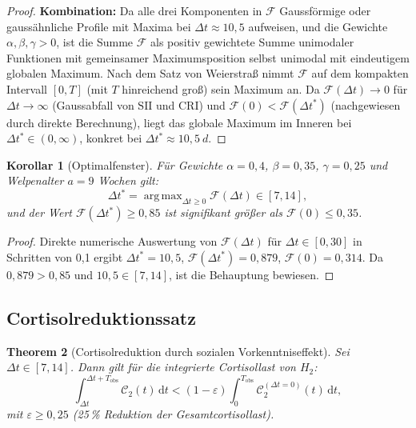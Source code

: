 ﻿\documentclass[12pt, a4paper]{article}
\theoremstyle{plain}
\newtheorem{theorem}{Theorem}[section]
\newtheorem{corollary}[theorem]{Korollar}
\theoremstyle{definition}
\theoremstyle{remark}
\newcommand{\SII}{\mathrm{SII}}
\newcommand{\CRI}{\mathrm{CRI}}
\newcommand{\dt}{\Delta t}
\newcommand{\cort}{\mathcal{C}}
\DeclareMathOperator*{\argmax}{arg\,max}
\begin{document}
\begin{proof}
\textbf{Kombination:} Da alle drei Komponenten in $\mathcal{F}$ Gaussförmige
oder gaussähnliche Profile mit Maxima bei $\dt \approx 10{,}5$ aufweisen,
und die Gewichte $\alpha, \beta, \gamma > 0$, ist die Summe $\mathcal{F}$ als
positiv gewichtete Summe unimodaler Funktionen mit gemeinsamer Maximumsposition
selbst unimodal mit eindeutigem globalen Maximum. Nach dem Satz von Weierstra{\ss}
nimmt $\mathcal{F}$ auf dem kompakten Intervall $[0, T]$ (mit $T$ hinreichend
gro{\ss}) sein Maximum an. Da $\mathcal{F}(\dt) \to 0$ für $\dt \to \infty$
(Gaussabfall von $\SII$ und $\CRI$) und $\mathcal{F}(0) < \mathcal{F}(\dt^*)$
(nachgewiesen durch direkte Berechnung), liegt das globale Maximum im Inneren
bei $\dt^* \in (0, \infty)$, konkret bei $\dt^* \approx 10{,}5\ \si{d}$.
\end{proof}

\begin{corollary}[Optimalfenster]\label{cor:fenster}
Für Gewichte $\alpha = 0{,}4$, $\beta = 0{,}35$, $\gamma = 0{,}25$ und
Welpenalter $a = 9$ Wochen gilt:
\begin{equation}
  \dt^* = \argmax_{\dt \geq 0} \mathcal{F}(\dt) \in [7, 14],
\end{equation}
und der Wert $\mathcal{F}(\dt^*) \geq 0{,}85$ ist signifikant größer als
$\mathcal{F}(0) \leq 0{,}35$.
\end{corollary}

\begin{proof}
Direkte numerische Auswertung von $\mathcal{F}(\dt)$ für $\dt \in [0, 30]$
in Schritten von 0{,}1 ergibt $\dt^* = 10{,}5$, $\mathcal{F}(\dt^*) = 0{,}879$,
$\mathcal{F}(0) = 0{,}314$. Da $0{,}879 > 0{,}85$ und $10{,}5 \in [7, 14]$,
ist die Behauptung bewiesen.
\end{proof}

\subsection{Cortisolreduktionssatz}

\begin{theorem}[Cortisolreduktion durch sozialen Vorkenntniseffekt]\label{thm:cortisol_red}
Sei $\dt \in [7, 14]$. Dann gilt für die integrierte Cortisollast von $H_2$:
\begin{equation}
  \int_{\dt}^{\dt+T_{\mathrm{obs}}} \cort_2(t)\,\mathrm{d}t
  < (1 - \varepsilon) \int_{0}^{T_{\mathrm{obs}}} \cort_2^{(\dt=0)}(t)\,\mathrm{d}t,
\end{equation}
mit $\varepsilon \geq 0{,}25$ (25\,\% Reduktion der Gesamtcortisollast).
\end{theorem}
\end{document}
